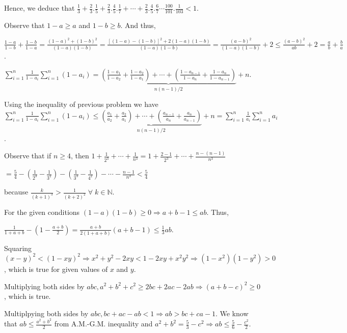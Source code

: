   Hence, we deduce that $\frac{1}{3} + \frac{2}{3}.\frac{1}{5} + \frac{2}{3}.\frac{4}{5}.\frac{1}{7} +
  \cdots + \frac{2}{3}.\frac{4}{5}.\frac{6}{7}\cdots \frac{100}{101}.\frac{1}{103} < 1$.
\item Observe that $1 - a\geq a$ and $1 - b\geq b$. And thus,

  $\frac{1 - a}{1 - b} + \frac{1 - b}{1 - a} = \frac{(1 - a)^2 + (1 - b)^2}{(1 - a)(1 - b)} = \frac{[(1 - a)
- (1 - b)]^2 + 2(1 - a)(1 - b)}{(1 - a)(1 - b)} = \frac{(a - b)^2}{(1 - a)(1 - b)} + 2\leq \frac{(a -
  b)^2}{ab} + 2 = \frac{a}{b}+ \frac{b}{a}$.
\item $\displaystyle\sum_{i=1}^n\frac{1}{1 - a_i}\sum_{i = 1}^n(1 - a_i) = \underbrace{\left(\frac{1 -
    a_1}{1 - a_2} + \frac{1 - a_2}{1 - a_1}\right) + \cdots + \left(\frac{1 - a_{n - 1}}{1 - a_n} + \frac{1
    - a_n}{1 - a_{n - 1}}\right)}_{n(n - 1)/2} + n$.

  Using the inequality of previous problem we have $\displaystyle\sum_{i=1}^n\frac{1}{1 - a_i}\sum_{i =
    1}^n(1 - a_i) \leq \underbrace{\left(\frac{a_1}{a_2} + \frac{a_2}{a_1}\right) + \cdots +
    \left(\frac{a_{n - 1}}{a_n} + \frac{a_n}{a_{n- 1}}\right)}_{n(n - 1)/2} + n = \sum_{i =
    1}^n\frac{1}{a_i} \sum_{i = 1}^na_i$.
\item Observe that if $n\geq 4$, then $1 + \frac{1}{2^3} + \cdots + \frac{1}{n^3} = 1 + \frac{2 - 1}{2^3} +
  \cdots + \frac{n - (n - 1)}{n^3}$

  $= \frac{5}{4} - \left(\frac{1}{2^3} - \frac{1}{3^2}\right) - \left(\frac{1}{3^3} - \frac{1}{4^2}\right) -
  \cdots - \frac{n - 1}{n^3} < \frac{5}{4}$

  because $\frac{k}{(k + 1)^3} > \frac{1}{(k + 2)^2}\;\forall\;k\in\mathbb{N}$.
\item For the given conditions $(1 - a)(1 - b)\geq 0 \Rightarrow a + b - 1\leq ab$. Thus,

  $\frac{1}{1 + a + b} - \left(1 - \frac{a + b}{2}\right) = \frac{a + b}{2(1 + a + b)}(a + b - 1)\leq
  \frac{1}{3}ab$.
\item Squaring $(x - y)^2 < (1 - xy)^2 \Rightarrow x^2 + y^2 - 2xy < 1 - 2xy + x^2y^2 \Rightarrow (1 -
  x^2)(1 - y^2) > 0$, which is true for given values of $x$ and $y$.
\item Multiplying both sides by $abc, a^2 + b^2 + c^2\geq 2bc + 2ac - 2ab \Rightarrow (a + b - c)^2\geq 0$,
  which is true.
\item Multiplpying both sides by $abc, bc + ac - ab < 1 \Rightarrow ab > bc + ca - 1$. We know that $ab \leq
  \frac{a^2 + b^2}{2}$ from A.M.-G.M. inequality and $a^2 + b^2 = \frac{5}{3} - c^2\Rightarrow ab \leq
  \frac{5}{6} - \frac{c^2}{2}$.

